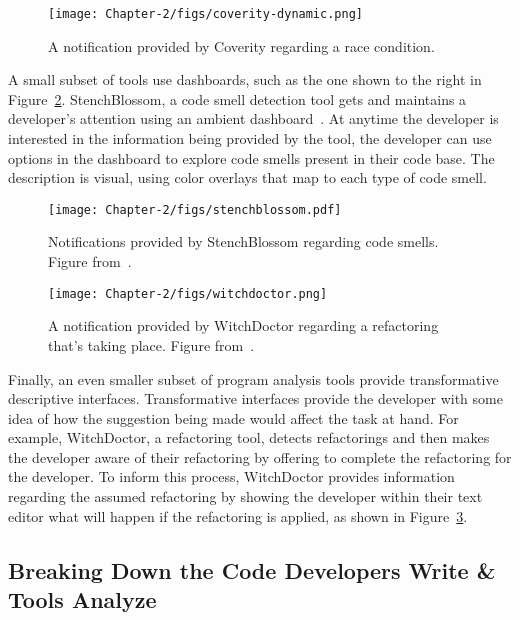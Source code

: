 \begin{figure}
	\centering
	\texttt{[image: Chapter-2/figs/coverity-dynamic.png]}
	\caption{A notification provided by Coverity regarding a race condition.}
	\label{fig:coverity}
\end{figure}

A small subset of tools use dashboards, such as the one shown to the right in Figure~\ref{fig:stench}. StenchBlossom, a code smell detection tool gets and maintains a developer's attention using an ambient dashboard~\cite{Murphy-Hill:2010:Ambient}. At anytime the developer is interested in the information being provided by the tool, the developer can use options in the dashboard to explore code smells present in their code base. The description is visual, using color overlays that map to each type of code smell. 

\begin{figure}
	\centering
	\texttt{[image: Chapter-2/figs/stenchblossom.pdf]}
	\caption{Notifications provided by StenchBlossom regarding code smells. Figure from~\cite{Murphy-Hill:2010:Ambient}.}
	\label{fig:stench}
\end{figure}

\begin{figure}
	\centering
	\texttt{[image: Chapter-2/figs/witchdoctor.png]}
	\caption{A notification provided by WitchDoctor regarding a refactoring that's taking place. Figure from~\cite{murphy2014recommendation}.}
	\label{fig:witch}
\end{figure}

Finally, an even smaller subset of program analysis tools provide transformative descriptive interfaces. Transformative interfaces provide the developer with some idea of how the suggestion being made would affect the task at hand. For example, WitchDoctor, a refactoring tool, detects refactorings and then makes the developer aware of their refactoring by offering to complete the refactoring for the developer. To inform this process, WitchDoctor provides information regarding the assumed refactoring by showing the developer within their text editor what will happen if the refactoring is applied, as shown in Figure~\ref{fig:witch}.



\subsection{Breaking Down the Code Developers Write \& Tools Analyze}

